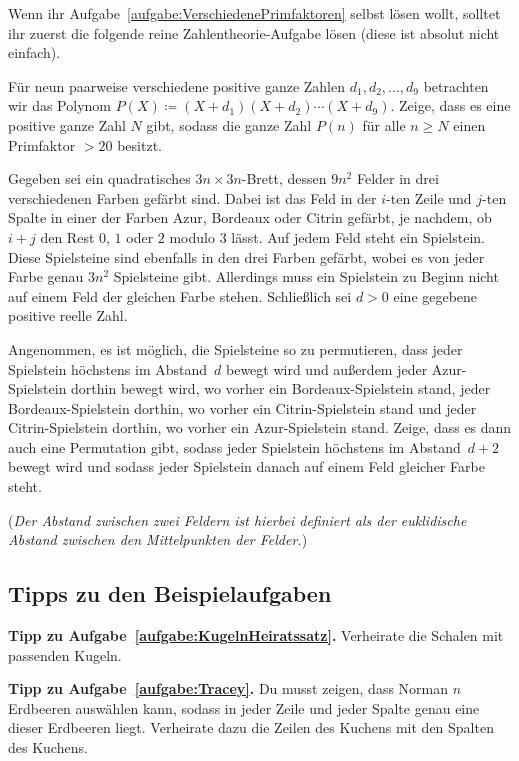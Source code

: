 Wenn ihr Aufgabe~\ref{aufgabe:VerschiedenePrimfaktoren} selbst lösen wollt, solltet ihr zuerst die folgende reine Zahlentheorie-Aufgabe lösen (diese ist absolut nicht einfach).
\begin{aufgabe*}[*]\label{aufgabe:PolynomPrimfaktor}
	Für neun paarweise verschiedene positive ganze Zahlen $d_1,d_2,\dotsc,d_9$ betrachten wir das Polynom $P(X)\coloneqq (X+d_1)(X+d_2)\dotsm (X+d_9)$. Zeige, dass es eine positive ganze Zahl $N$ gibt, sodass die ganze Zahl $P(n)$ für alle $n\geqslant N$ einen Primfaktor $>20$ besitzt.
\end{aufgabe*}
\begin{aufgabe*}[*]\label{aufgabe:AzurBordeauxCitrin}
	Gegeben sei ein quadratisches $3n\times 3n$-Brett, dessen $9n^2$ Felder in drei verschiedenen Farben gefärbt sind. Dabei ist das Feld in der $i$-ten Zeile und $j$-ten Spalte in einer der Farben Azur, Bordeaux oder Citrin gefärbt, je nachdem, ob $i+j$ den Rest $0$, $1$ oder $2$ modulo $3$ lässt. Auf jedem Feld steht ein Spielstein. Diese Spielsteine sind ebenfalls in den drei Farben gefärbt, wobei es von jeder Farbe genau $3n^2$ Spielsteine gibt. Allerdings muss ein Spielstein zu Beginn nicht auf einem Feld der gleichen Farbe stehen. Schließlich sei $d>0$ eine gegebene positive reelle Zahl.
	
	Angenommen, es ist möglich, die Spielsteine so zu permutieren, dass jeder Spielstein höchstens im Abstand~$d$ bewegt wird und außerdem jeder Azur-Spielstein dorthin bewegt wird, wo vorher ein Bordeaux-Spielstein stand, jeder Bordeaux-Spielstein dorthin, wo vorher ein Citrin-Spielstein stand und jeder Citrin-Spielstein dorthin, wo vorher ein Azur-Spielstein stand. Zeige, dass es dann auch eine Permutation gibt, sodass jeder Spielstein höchstens im Abstand~$d+2$ bewegt wird und sodass jeder Spielstein danach auf einem Feld gleicher Farbe steht.
	
	(\emph{Der Abstand zwischen zwei Feldern ist hierbei definiert als der euklidische Abstand zwischen den Mittelpunkten der Felder.})
\end{aufgabe*}

\subsection*{Tipps zu den Beispielaufgaben}
\textbf{Tipp zu Aufgabe~\ref{aufgabe:KugelnHeiratssatz}.} Verheirate die Schalen mit passenden Kugeln.

\textbf{Tipp zu Aufgabe~\ref{aufgabe:Tracey}.} Du musst zeigen, dass Norman $n$ Erdbeeren auswählen kann, sodass in jeder Zeile und jeder Spalte genau eine dieser Erdbeeren liegt. Verheirate dazu die Zeilen des Kuchens mit den Spalten des Kuchens.

